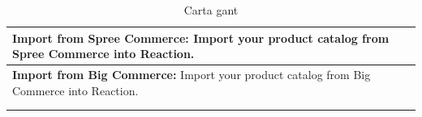 \begin{table}[h!]
\begin{tabular}{ |L{0.6\paperwidth}|L{0.1\paperwidth}|}
\\ \hline
	\textbf{ Import from Spree Commerce:} Import your product catalog from Spree Commerce into Reaction.&
	
\\ \hline
	\textbf{ Import from Big Commerce:} Import your product catalog from Big Commerce into Reaction.&
	
\\ \hline
	&
	
\\ \hline
	&
				
\\ \hline
\end{tabular}
    \caption{ Carta gant}
    \label{tab:task_proyect}
\end{table}

%
%	
%	
